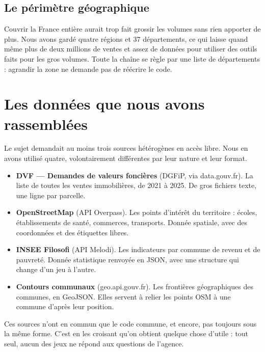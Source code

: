 \documentclass[11pt,a4paper]{article}
\begin{document}
\subsection{Le périmètre géographique}

Couvrir la France entière aurait trop fait grossir les volumes sans rien apporter de plus. Nous avons gardé quatre régions et \num{37} départements, ce qui laisse quand même plus de deux millions de ventes et assez de données pour utiliser des outils faits pour les gros volumes. Toute la chaîne se règle par une liste de départements : agrandir la zone ne demande pas de réécrire le code.

\section{Les données que nous avons rassemblées}

Le sujet demandait au moins trois sources hétérogènes en accès libre. Nous en avons utilisé quatre, volontairement différentes par leur nature et leur format.

\begin{itemize}
  \item \textbf{DVF --- Demandes de valeurs foncières} (DGFiP, via data.gouv.fr). La liste de toutes les ventes immobilières, de 2021 à 2025. De gros fichiers texte, une ligne par parcelle.
  \item \textbf{OpenStreetMap} (API Overpass). Les points d'intérêt du territoire : écoles, établissements de santé, commerces, transports. Donnée spatiale, avec des coordonnées et des étiquettes libres.
  \item \textbf{INSEE Filosofi} (API Melodi). Les indicateurs par commune de revenu et de pauvreté. Donnée statistique renvoyée en JSON, avec une structure qui change d'un jeu à l'autre.
  \item \textbf{Contours communaux} (geo.api.gouv.fr). Les frontières géographiques des communes, en GeoJSON. Elles servent à relier les points OSM à une commune d'après leur position.
\end{itemize}

Ces sources n'ont en commun que le code commune, et encore, pas toujours sous la même forme. C'est en les croisant qu'on obtient quelque chose d'utile : tout seul, aucun des jeux ne répond aux questions de l'agence.
\end{document}
